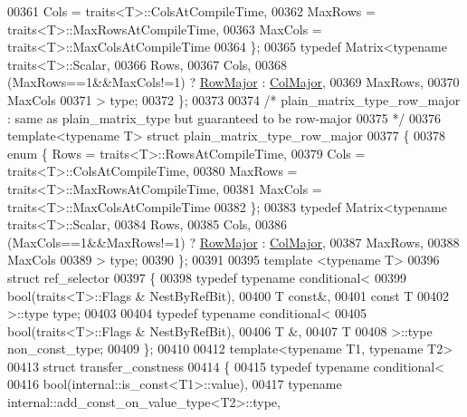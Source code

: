 \begin{DoxyCode}
{00361          Cols = traits<T>::ColsAtCompileTime,
00362          MaxRows = traits<T>::MaxRowsAtCompileTime,
00363          MaxCols = traits<T>::MaxColsAtCompileTime
00364   \};
00365   \textcolor{keyword}{typedef} Matrix<typename traits<T>::Scalar,
00366                 Rows,
00367                 Cols,
00368                 (MaxRows==1&&MaxCols!=1) ? \hyperlink{group__enums_ggaacded1a18ae58b0f554751f6cdf9eb13acfcde9cd8677c5f7caf6bd603666aae3}{RowMajor} : \hyperlink{group__enums_ggaacded1a18ae58b0f554751f6cdf9eb13a0cbd4bdd0abcfc0224c5fcb5e4f6669a}{ColMajor},
00369                 MaxRows,
00370                 MaxCols
00371           > type;
00372 \};
00373 
00374 \textcolor{comment}{/* plain\_matrix\_type\_row\_major : same as plain\_matrix\_type but guaranteed to be row-major}
00375 \textcolor{comment}{ */}
00376 \textcolor{keyword}{template}<\textcolor{keyword}{typename} T> \textcolor{keyword}{struct }plain\_matrix\_type\_row\_major
00377 \{
00378   \textcolor{keyword}{enum} \{ Rows = traits<T>::RowsAtCompileTime,
00379          Cols = traits<T>::ColsAtCompileTime,
00380          MaxRows = traits<T>::MaxRowsAtCompileTime,
00381          MaxCols = traits<T>::MaxColsAtCompileTime
00382   \};
00383   \textcolor{keyword}{typedef} Matrix<typename traits<T>::Scalar,
00384                 Rows,
00385                 Cols,
00386                 (MaxCols==1&&MaxRows!=1) ? \hyperlink{group__enums_ggaacded1a18ae58b0f554751f6cdf9eb13acfcde9cd8677c5f7caf6bd603666aae3}{RowMajor} : \hyperlink{group__enums_ggaacded1a18ae58b0f554751f6cdf9eb13a0cbd4bdd0abcfc0224c5fcb5e4f6669a}{ColMajor},
00387                 MaxRows,
00388                 MaxCols
00389           > type;
00390 \};
00391 
00395 \textcolor{keyword}{template} <\textcolor{keyword}{typename} T>
00396 \textcolor{keyword}{struct }ref\_selector
00397 \{
00398   \textcolor{keyword}{typedef} \textcolor{keyword}{typename} conditional<
00399     bool(traits<T>::Flags & NestByRefBit),
00400     T \textcolor{keyword}{const}&,
00401     \textcolor{keyword}{const} T
00402   >::type type;
00403   
00404   \textcolor{keyword}{typedef} \textcolor{keyword}{typename} conditional<
00405     bool(traits<T>::Flags & NestByRefBit),
00406     T &,
00407     T
00408   >::type non\_const\_type;
00409 \};
00410 
00412 \textcolor{keyword}{template}<\textcolor{keyword}{typename} T1, \textcolor{keyword}{typename} T2>
00413 \textcolor{keyword}{struct }transfer\_constness
00414 \{
00415   \textcolor{keyword}{typedef} \textcolor{keyword}{typename} conditional<
00416     bool(internal::is\_const<T1>::value),
00417     \textcolor{keyword}{typename} internal::add\_const\_on\_value\_type<T2>::type,
}
\end{DoxyCode}
